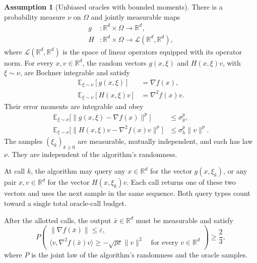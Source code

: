\documentclass[10pt]{article}
\theoremstyle{definition}
\newtheorem{assumption}{Assumption}
\begin{document}
\begin{assumption}[Unbiased oracles with bounded moments]
There is a probability measure $\nu$ on $\Omega$ and jointly measurable maps
\[
\begin{aligned}
g &: \mathbb{R}^d\times\Omega\to\mathbb{R}^d,\\
H &: \mathbb{R}^d\times\Omega\to\mathcal{L}(\mathbb{R}^d,\mathbb{R}^d),
\end{aligned}
\]
where $\mathcal{L}(\mathbb{R}^d,\mathbb{R}^d)$ is the space of linear operators equipped with its operator norm. For every $x,v\in\mathbb{R}^d$, the random vectors $g(x,\xi)$ and $H(x,\xi)v$, with $\xi\sim\nu$, are Bochner integrable and satisfy
\[
\begin{aligned}
\mathbb{E}_{\xi\sim\nu}[g(x,\xi)]&=\nabla f(x),\\
\mathbb{E}_{\xi\sim\nu}[H(x,\xi)v]&=\nabla^2 f(x)v.
\end{aligned}
\]
Their error moments are integrable and obey
\[
\begin{aligned}
\mathbb{E}_{\xi\sim\nu}\bigl[\|g(x,\xi)-\nabla f(x)\|^p\bigr]
&\leq\sigma_g^p,\\
\mathbb{E}_{\xi\sim\nu}\bigl[\|H(x,\xi)v-\nabla^2 f(x)v\|^p\bigr]
&\leq\sigma_h^p\|v\|^p.
\end{aligned}
\]
The samples $(\xi_k)_{k\geq0}$ are measurable, mutually independent, and each has law $\nu$. They are independent of the algorithm's randomness.
\end{assumption}

At call $k$, the algorithm may query any $x\in\mathbb{R}^d$ for the vector $g(x,\xi_k)$, or any pair $x,v\in\mathbb{R}^d$ for the vector $H(x,\xi_k)v$. Each call returns one of these two vectors and uses the next sample in the same sequence. Both query types count toward a single total oracle-call budget.

After the allotted calls, the output $\bar{x}\in\mathbb{R}^d$ must be measurable and satisfy
\[
P\!\left(
\begin{gathered}
\|\nabla f(\bar{x})\|\leq\varepsilon,\\
\langle v,\nabla^2 f(\bar{x})v\rangle
\geq-\sqrt{\rho\varepsilon}\|v\|^2
\quad\text{for every }v\in\mathbb{R}^d
\end{gathered}
\right)\geq\frac{2}{3},
\]
where $P$ is the joint law of the algorithm's randomness and the oracle samples.
\end{document}
